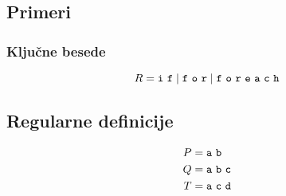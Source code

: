 \documentclass{report}
\newcommand{\N}[1]{#1}
\newcommand{\Char}[1]{\texttt{#1}}
\newcommand{\Spc}{\ }
\newcommand{\Union}{\mathrel{|}}
\newcommand{\RE}[1]{{\uppercase{#1}}}
\begin{document}
\subsection*{Primeri}
\subsubsection{Ključne besede}

\begin{equation*}
  \N{\RE{r}} = \Char{i} \Spc \Char{f} \Union \Char{f} \Spc \Char{o} \Spc \Char{r} \Union \Char{f} \Spc \Char{o} \Spc \Char{r} \Spc \Char{e} \Spc \Char{a} \Spc \Char{c} \Spc \Char{h}
\end{equation*}

\subsection{Regularne definicije}

\begin{align*}
  \N{\RE{p}} &= \Char{a} \Spc \Char{b}\\
  \N{\RE{q}} &= \Char{a} \Spc \Char{b} \Spc \Char{c}\\
  \N{\RE{t}} &= \Char{a} \Spc \Char{c} \Spc \Char{d}
\end{align*}
\end{document}

